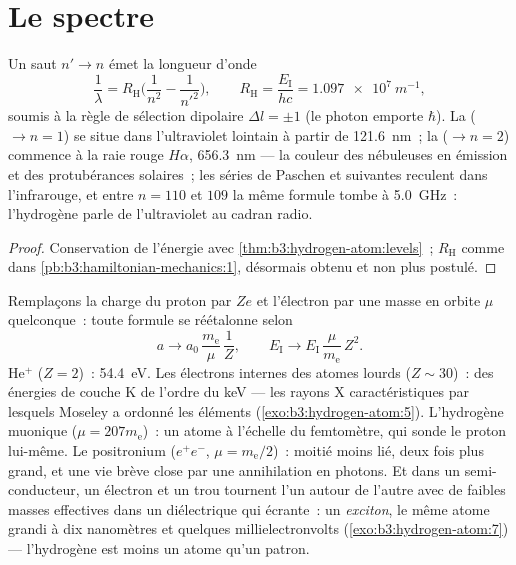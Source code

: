 \section{Le spectre}

\begin{proposition}\label{prop:b3:hydrogen-atom:series}
Un saut $n' \to n$ émet la longueur d'onde
\[
\frac{1}{\lambda} = R_{\text{H}}\Big(\frac{1}{n^2} -
\frac{1}{n'^2}\Big) , \qquad
R_{\text{H}} = \frac{E_{\text{I}}}{hc} = \qty{1.097e7}{m^{-1}} ,
\]
soumis à la règle de sélection dipolaire $\Delta l = \pm1$ (le photon
emporte $\hbar$). La  ($\to n = 1$) se situe dans
l'ultraviolet lointain à partir de \qty{121.6}{nm}~; la  ($\to n = 2$) commence à la raie rouge $H\alpha$,
\qty{656.3}{nm} --- la couleur des nébuleuses en émission et des
protubérances solaires~; les séries de Paschen et suivantes reculent
dans l'infrarouge, et entre $n = 110$ et $109$ la même formule tombe à
\qty{5.0}{GHz}~: l'hydrogène parle de l'ultraviolet au cadran radio.
\end{proposition}

\begin{proof}
Conservation de l'énergie avec \cref{thm:b3:hydrogen-atom:levels}~;
$R_{\text{H}}$ comme dans \cref{pb:b3:hamiltonian-mechanics:1},
désormais obtenu et non plus postulé.
\end{proof}

\begin{example}\label{ex:b3:hydrogen-atom:scaling}
Remplaçons la charge du proton par $Ze$ et l'électron par une masse en
orbite $\mu$ quelconque~: toute formule se réétalonne selon
\[
a \to a_0\,\frac{m_{\text{e}}}{\mu}\,\frac1Z , \qquad
E_{\text{I}} \to E_{\text{I}}\,\frac{\mu}{m_{\text{e}}}\,Z^2 .
\]
He$^+$ ($Z = 2$)~: \qty{54.4}{eV}. Les électrons internes des atomes
lourds ($Z \sim 30$)~: des énergies de couche K de l'ordre du keV ---
les rayons X caractéristiques par lesquels Moseley a ordonné les
éléments (\cref{exo:b3:hydrogen-atom:5}). L'hydrogène muonique ($\mu = 207
m_{\text{e}}$)~: un atome à l'échelle du femtomètre, qui sonde le
proton lui-même. Le positronium ($e^+e^-$, $\mu = m_{\text{e}}/2$)~:
moitié moins lié, deux fois plus grand, et une vie brève close par une
annihilation en photons. Et dans un semi-conducteur, un électron et un
trou tournent l'un autour de l'autre avec de faibles masses effectives
dans un diélectrique qui écrante~: un \emph{exciton}, le même atome
grandi à dix nanomètres et quelques millielectronvolts
(\cref{exo:b3:hydrogen-atom:7}) --- l'hydrogène est moins un atome
qu'un patron.
\end{example}

